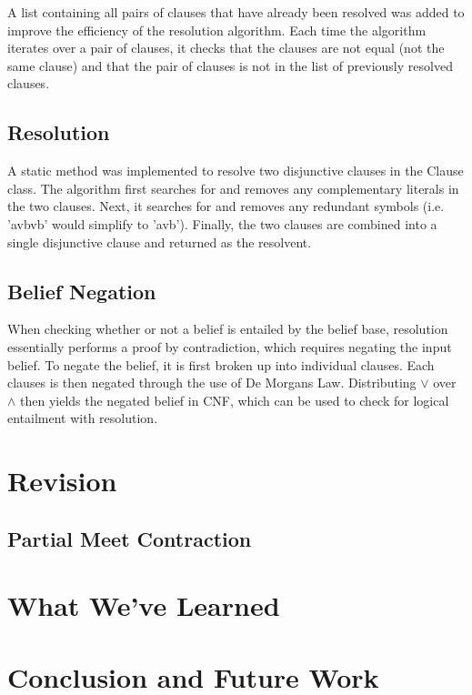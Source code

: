 \documentclass[a4paper,10pt]{article}
\begin{document}
A list containing all pairs of clauses that have already been resolved was added to improve the efficiency of the resolution algorithm. Each time the algorithm
iterates over a pair of clauses, it checks that the clauses are not equal (not the same clause) and that the pair of clauses is not in the list of previously
resolved clauses. \\

\subsection{Resolution}
\label{subsec:resolution}
A static method was implemented to resolve two disjunctive clauses in the Clause class. The algorithm first searches for and removes any complementary literals
in the two clauses. Next, it searches for and removes any redundant symbols (i.e. 'avbvb' would simplify to 'avb'). Finally, the two clauses are combined into
a single disjunctive clause and returned as the resolvent.

\subsection{Belief Negation}
\label{subsec:negation}
When checking whether or not a belief is entailed by the belief base, resolution essentially performs a proof by contradiction, which requires negating the input belief.
To negate the belief, it is first broken up into individual clauses. Each clauses is then negated through the use of De Morgans Law. Distributing $\vee$ over $\wedge$
then yields the negated belief in CNF, which can be used to check for logical entailment with resolution.

\section{Revision}
\label{sec:revision}


\subsection{Partial Meet Contraction}
\label{subsec:contraction}


\section{What We've Learned}
\label{sec:learned}


\section{Conclusion and Future Work}
\label{sec:conclusion}



\end{document}
